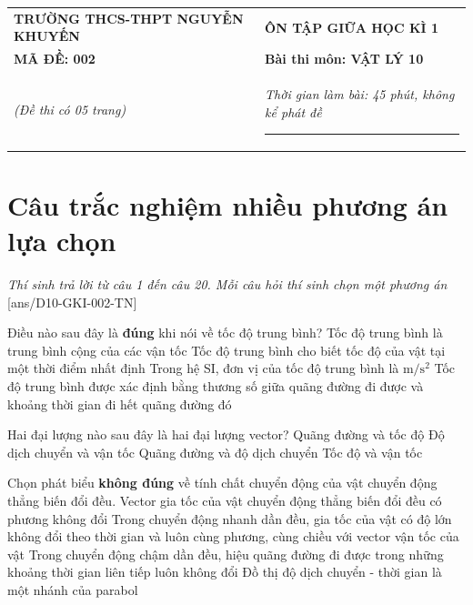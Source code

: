 \begin{center}
	\begin{tabular}{M{9.25cm}M{8.75cm}}
		\textbf{TRƯỜNG THCS-THPT NGUYỄN KHUYẾN}& \textbf{ÔN TẬP GIỮA HỌC KÌ 1}\\
		\textbf{MÃ ĐỀ: 002}& \textbf{Bài thi môn: VẬT LÝ 10}\\
		\textit{(Đề thi có 05 trang)}& \textit{Thời gian làm bài: 45 phút, không kể phát đề}
		
		\noindent\rule{4cm}{0.8pt} \\
	\end{tabular}
\end{center}
\setcounter{section}{0}
\section{Câu trắc nghiệm nhiều phương án lựa chọn}
\textit{Thí sinh trả lời từ câu 1 đến câu 20. Mỗi câu hỏi thí sinh chọn một phương án}
\setcounter{ex}{0}
[ans/D10-GKI-002-TN]
\begin{ex}
	Điều nào sau đây là \textbf{đúng} khi nói về tốc độ trung bình?
	\choice
	{Tốc độ trung bình là trung bình cộng của các vận tốc}
	{Tốc độ trung bình cho biết tốc độ của vật tại một thời điểm nhất định}
	{Trong hệ SI, đơn vị của tốc độ trung bình là $\si{\meter/\second^2}$}
	{\True Tốc độ trung bình được xác định bằng thương số giữa quãng đường đi được và khoảng thời gian đi hết quãng đường đó}
	\loigiai{}
\end{ex}
\begin{ex}
	Hai đại lượng nào sau đây là hai đại lượng vector?
	\choice
	{Quãng đường và tốc độ}
	{\True Độ dịch chuyển và vận tốc}
	{Quãng đường và độ dịch chuyển}
	{Tốc độ và vận tốc}
	\loigiai{}
\end{ex}
\begin{ex}
	Chọn phát biểu \textbf{không đúng} về tính chất chuyển động của vật chuyển động thẳng biến đổi đều.
	\choice
	{Vector gia tốc của vật chuyển động thẳng biến đổi đều có phương không đổi}
	{Trong chuyển động nhanh dần đều, gia tốc của vật có độ lớn không đổi theo thời gian và luôn cùng phương, cùng chiều với vector vận tốc của vật}
	{\True Trong chuyển động chậm dần đều, hiệu quãng đường đi được trong những khoảng thời gian liên tiếp luôn không đổi}
	{Đồ thị độ dịch chuyển - thời gian là một nhánh của parabol}
	\loigiai{}
\end{ex}
